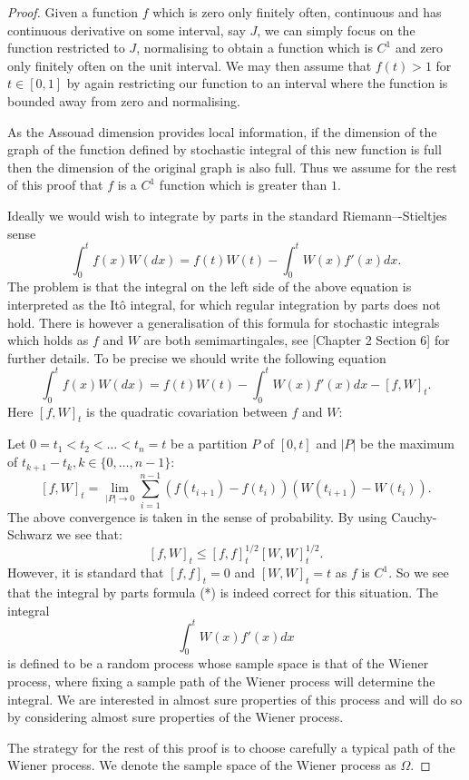 \begin{proof}
	Given a function $f$ which is zero only finitely often, continuous and has continuous derivative on some interval, say $J$, we can simply focus on the function restricted to $J$, normalising to obtain a function which is $C^1$ and zero only finitely often on the unit interval. We may then assume that $f(t)>1$ for $t\in [0,1]$ by again restricting our function to an interval where the function is bounded away from zero and normalising. 
	
	As the Assouad dimension provides local information, if the dimension of the graph of the function defined by stochastic integral of this new function is full then the dimension of the original graph is also full. Thus we assume for the rest of this proof that $f$ is a $C^1$ function which is greater than $1$.
	
	Ideally we would wish to integrate by parts in the standard Riemann–-Stieltjes sense
	\[
	\int_{0}^{t}f(x)W(dx)=f(t)W(t)-\int_{0}^{t}W(x)f'(x)dx.\tag{*}
	\]
	The problem is that the integral on the left side of the above equation is interpreted as the It\^{o} integral, for which regular integration by parts does not hold. There is however a generalisation of this formula for stochastic integrals which holds as $f$ and $W$ are both semimartingales, see \cite{Pr}[Chapter 2 Section 6] for further details. To be precise we should write the following equation
	\[
	\int_{0}^{t}f(x)W(dx)=f(t)W(t)-\int_{0}^{t}W(x)f'(x)dx-[f,W]_t.
	\]
	Here $[f,W]_t$ is the quadratic covariation between $f$ and $W$:
	
	Let $0=t_1<t_2<\dots<t_n=t$ be a partition $P$ of $[0,t]$ and $\vert P \vert$ be the maximum of $t_{k+1}-t_k,k\in\{0,\dots,n-1\}$:
	\[
	[f,W]_t=\lim_{\vert P\vert\to 0} \sum_{i=1}^{n-1} (f(t_{i+1})-f(t_{i}))(W(t_{i+1})-W(t_i)).
	\]
	The above convergence is taken in the sense of probability. By using Cauchy-Schwarz we see that:
	\[
	[f,W]_t\leq [f,f]^{1/2}_t[W,W]^{1/2}_t.
	\]
	However, it is standard that $[f,f]_t=0$ and $[W,W]_t=t$ as $f$ is $C^1$. So we see that the integral by parts formula (*) is indeed correct for this situation. The integral 
	\[
	\int_0^{t} W(x)f'(x)dx
	\]
	is defined to be a random process whose sample space is that of the Wiener process, where fixing a sample path of the Wiener process will determine the integral. We are interested in almost sure properties of this process and will do so by considering almost sure properties of the Wiener process.
	
	The strategy for the rest of this proof is to choose carefully a typical path of the Wiener process. We denote the sample space of the Wiener process as $\Omega$.
	

\end{proof}
